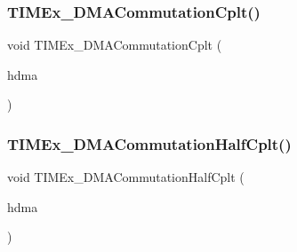 \subsubsection{\texorpdfstring{T\+I\+M\+Ex\+\_\+\+D\+M\+A\+Commutation\+Cplt()}{TIMEx\_DMACommutationCplt()}}
{\footnotesize\ttfamily void T\+I\+M\+Ex\+\_\+\+D\+M\+A\+Commutation\+Cplt (\begin{DoxyParamCaption}\item[{\hyperlink{group___d_m_a___exported___types_ga41b754a906b86bce54dc79938970138b}{D\+M\+A\+\_\+\+Handle\+Type\+Def} $\ast$}]{hdma }\end{DoxyParamCaption})}

\mbox{\label{group___t_i_m_ex___private___functions_ga65b7244a1ee94cf20081543377ba8d2a}} 
\subsubsection{\texorpdfstring{T\+I\+M\+Ex\+\_\+\+D\+M\+A\+Commutation\+Half\+Cplt()}{TIMEx\_DMACommutationHalfCplt()}}
{\footnotesize\ttfamily void T\+I\+M\+Ex\+\_\+\+D\+M\+A\+Commutation\+Half\+Cplt (\begin{DoxyParamCaption}\item[{\hyperlink{group___d_m_a___exported___types_ga41b754a906b86bce54dc79938970138b}{D\+M\+A\+\_\+\+Handle\+Type\+Def} $\ast$}]{hdma }\end{DoxyParamCaption})}

